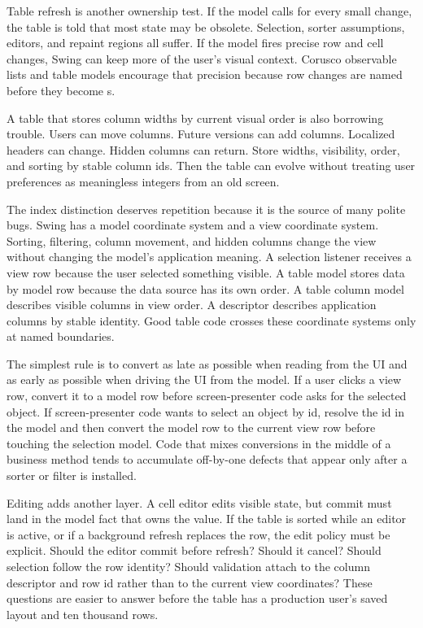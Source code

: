 Table refresh is another ownership test. If the model calls
 for every small change, the table is told that most
state may be obsolete. Selection, sorter assumptions, editors, and repaint
regions all suffer. If the model fires precise row and cell changes, Swing can
keep more of the user's visual context. Corusco observable lists and table
models encourage that precision because row changes are named before they
become s.

A table that stores column widths by current visual order is also borrowing
trouble. Users can move columns. Future versions can add columns. Localized
headers can change. Hidden columns can return. Store widths, visibility, order,
and sorting by stable column ids. Then the table can evolve without treating
user preferences as meaningless integers from an old screen.

The index distinction deserves repetition because it is the source of many
polite bugs. Swing has a model coordinate system and a view coordinate system.
Sorting, filtering, column movement, and hidden columns change the view without
changing the model's application meaning. A selection listener receives a view
row because the user selected something visible. A table model stores data by
model row because the data source has its own order. A table column model
describes visible columns in view order. A descriptor describes application
columns by stable identity. Good table code crosses these coordinate systems
only at named boundaries.

The simplest rule is to convert as late as possible when reading from the UI
and as early as possible when driving the UI from the model. If a user clicks a
view row, convert it to a model row before screen-presenter code asks for the selected
object. If screen-presenter code wants to select an object by id, resolve the id in
the model and then convert the model row to the current view row before touching
the selection model. Code that mixes conversions in the middle of a business
method tends to accumulate off-by-one defects that appear only after a sorter
or filter is installed.

Editing adds another layer. A cell editor edits visible state, but commit must
land in the model fact that owns the value. If the table is sorted while an
editor is active, or if a background refresh replaces the row, the edit policy
must be explicit. Should the editor commit before refresh? Should it cancel?
Should selection follow the row identity? Should validation attach to the
column descriptor and row id rather than to the current view coordinates? These
questions are easier to answer before the table has a production user's saved
layout and ten thousand rows.

